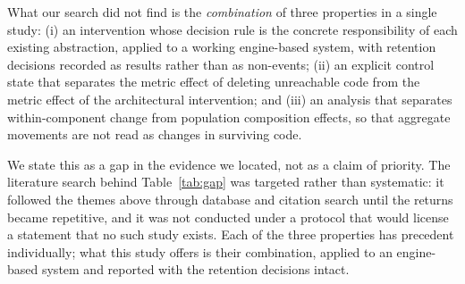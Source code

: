 \documentclass{sbc2019}%
\begin{document}
What our search did not find is the \emph{combination} of three properties in a
single study: (i) an intervention whose decision rule is the concrete
responsibility of each existing abstraction, applied to a working engine-based
system, with retention decisions recorded as results rather than as non-events;
(ii) an explicit control state that separates the metric effect of deleting
unreachable code from the metric effect of the architectural intervention; and
(iii) an analysis that separates within-component change from population
composition effects, so that aggregate movements are not read as changes in
surviving code.

We state this as a gap in the evidence we located, not as a claim of priority.
The literature search behind Table~\ref{tab:gap} was targeted rather than
systematic: it followed the themes above through database and citation search
until the returns became repetitive, and it was not conducted under a protocol
that would license a statement that no such study exists. Each of the three
properties has precedent individually; what this study offers is their
combination, applied to an engine-based system and reported with the retention
decisions intact.
\end{document}
